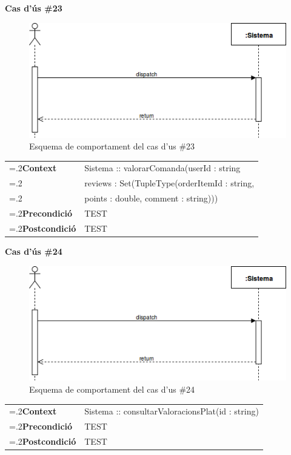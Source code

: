 \clearpage
\noindent\textbf{\large Cas d'ús \#23}\\
\begin{figure}[H]
\centering
\includegraphics[scale=0.6]{Figures/casdus_00.png}
\caption{Esquema de comportament del cas d'us \#23}
\end{figure}
\begin{table}[h]
\noindent
\begin{tabularx}{\linewidth}{
>{\hsize=.2\hsize}X%
>{\hsize=0.8\hsize}X%
}
\textbf{Context} 		& Sistema :: valorarComanda(userId : string\\
						& reviews : Set(TupleType(orderItemId : string, \\
						& points : double, comment : string))) \\
\textbf{Precondició} 	& TEST \\
\textbf{Postcondició}	& TEST \\
\end{tabularx}
\label{}
\end{table}

\noindent\textbf{\large Cas d'ús \#24}\\
\begin{figure}[H]
\centering
\includegraphics[scale=0.6]{Figures/casdus_00.png}
\caption{Esquema de comportament del cas d'us \#24}
\end{figure}
\begin{table}[h]
\noindent
\begin{tabularx}{\linewidth}{
>{\hsize=.2\hsize}X%
>{\hsize=0.8\hsize}X%
}
\textbf{Context} 		& Sistema :: consultarValoracionsPlat(id : string) \\
\textbf{Precondició} 	& TEST \\
\textbf{Postcondició}	& TEST \\
\end{tabularx}
\label{}
\end{table}

